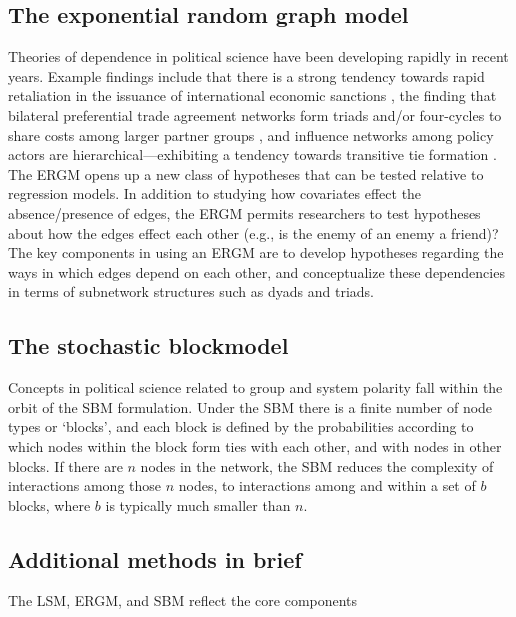 \documentclass[fleqn,12pt]{wlscirep}
\begin{document}
\subsection{The exponential random graph model}

Theories of dependence in political science have been developing rapidly in recent years. Example findings include that there is a strong tendency towards rapid retaliation in the issuance of international economic sanctions \citep{cranmer2014reciprocity}, the finding that bilateral preferential trade agreement networks form triads and/or four-cycles to share costs among larger partner groups \citep{milewicz2018beyond}, and influence networks among policy actors are hierarchical---exhibiting a tendency towards transitive tie formation \citep{christopoulos2015exceptional}.  The ERGM opens up a new class of hypotheses that can be tested relative to regression models. In addition to studying how covariates effect the absence/presence of edges, the ERGM permits researchers to test hypotheses about how the edges effect each other (e.g., is the enemy of an enemy a friend)? The key components in using an ERGM are to develop hypotheses regarding the ways in which edges depend on each other, and conceptualize these dependencies in terms of subnetwork structures such as dyads and triads.

\subsection{The stochastic blockmodel}

Concepts in political science related to group  and system polarity \citep[e.g., ][]{baldassarri2007dynamics,cranmer2015kantian} fall within the orbit of the SBM formulation. Under the SBM there is a finite number of node types or `blocks', and each block is defined by the probabilities according to which nodes within the block form ties with each other, and with nodes in other blocks. If there are $n$ nodes in the network, the SBM reduces the complexity of interactions among those $n$  nodes, to interactions among and within a set of $b$ blocks, where $b$ is typically much smaller than $n$. 

\subsection{Additional methods in brief}

The LSM, ERGM, and SBM reflect the core components
\end{document}
